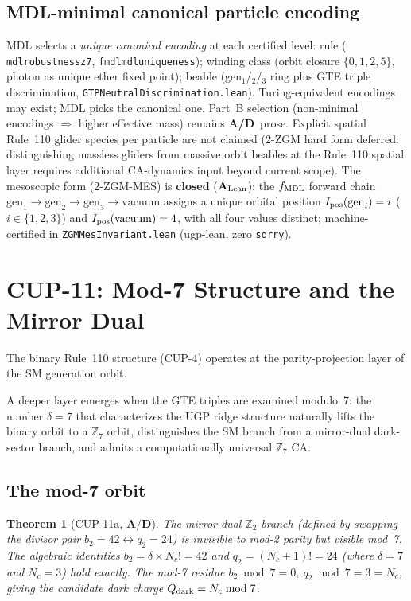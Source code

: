 \documentclass[11pt]{article}
\newtheorem{theorem}{Theorem}[section]
\theoremstyle{remark}
\newcommand{\lean}[1]{%
  \penalty-100
  \begingroup\def\_{\textunderscore\allowbreak}\texttt{#1}\endgroup}
\newcommand{\CatAL}{\ensuremath{\textbf{A}_{\rm Lean}}}
\newcommand{\CatAD}{\textbf{A/D}}
\begin{document}
\subsection{MDL-minimal canonical particle encoding}
\label{ssec:puq_encoding}

MDL selects a \emph{unique canonical encoding} at each certified level:
rule (\lean{mdl\_robustness\_z7}, \lean{fmdl\_mdl\_uniqueness});
winding class (orbit closure $\{0,1,2,5\}$, photon as unique ether fixed point);
beable (gen$_1$/$_2$/$_3$ ring plus GTE triple discrimination,
\lean{GTPNeutralDiscrimination.lean}).
Turing-equivalent encodings may exist; MDL picks the canonical one.
Part~B selection (non-minimal encodings $\Rightarrow$ higher effective mass) remains
\CatAD\ prose.
Explicit spatial Rule~110 glider species per particle are not claimed (2-ZGM hard form deferred: distinguishing massless gliders from massive orbit beables at the Rule~110 spatial layer requires additional CA-dynamics input beyond current scope). The mesoscopic form (2-ZGM-MES) is \textbf{closed} ($\CatAL$): the $f_{\rm MDL}$ forward chain $\mathrm{gen}_1 \to \mathrm{gen}_2 \to \mathrm{gen}_3 \to \mathrm{vacuum}$ assigns a unique orbital position $I_{\rm pos}(\mathrm{gen}_i) = i$ ($i \in \{1,2,3\}$) and $I_{\rm pos}(\mathrm{vacuum}) = 4$, with all four values distinct; machine-certified in \lean{ZGMMesInvariant.lean} (ugp-lean, zero \texttt{sorry}).

\section{CUP-11: Mod-7 Structure and the Mirror Dual}
\label{sec:cup11}

The binary Rule~110 structure (CUP-4) operates at the parity-projection layer of the SM generation orbit.

A deeper layer emerges when the GTE triples are examined modulo~7: the number $\delta = 7$ that characterizes the UGP ridge structure naturally lifts the binary orbit to a $\mathbb{Z}_7$ orbit, distinguishes the SM branch from a mirror-dual dark-sector branch, and admits a computationally universal $\mathbb{Z}_7$ CA.

\subsection{The mod-7 orbit}

\begin{theorem}[CUP-11a, $\CatAD$]
\label{thm:cup11a}
The mirror-dual $\mathbb{Z}_2$ branch (defined by swapping the divisor pair
$b_2 = 42 \leftrightarrow q_2 = 24$) is invisible to mod-2 parity but visible mod~7.
The algebraic identities $b_2 = \delta \times N_c! = 42$ and $q_2 = (N_c+1)! = 24$
(where $\delta = 7$ and $N_c = 3$) hold exactly. The mod-7 residue $b_2 \bmod 7 = 0$,
$q_2 \bmod 7 = 3 = N_c$, giving the candidate dark charge $Q_{\rm dark} = N_c \bmod 7$.
\end{theorem}
\end{document}
